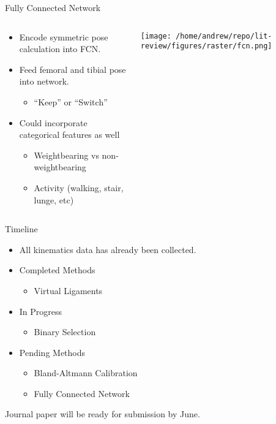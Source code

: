\documentclass[presentation, aspectratio=1610]{beamer}
\begin{document}
\begin{frame}[label={sec:org2197c22}]{Fully Connected Network}
\begin{columns}
\begin{column}{0.5\columnwidth}
\begin{itemize}
\item Encode symmetric pose calculation into FCN.
\item Feed femoral and tibial \alert{\alert{pose}} into network.
\begin{itemize}
\item ``Keep'' or ``Switch''
\end{itemize}
\item Could incorporate categorical features as well
\begin{itemize}
\item Weightbearing vs non-weightbearing
\item Activity (walking, stair, lunge, etc)
\end{itemize}
\end{itemize}
\end{column}

\begin{column}{0.6\columnwidth}
\begin{center}
\texttt{[image: /home/andrew/repo/lit-review/figures/raster/fcn.png]}
\end{center}
\end{column}
\end{columns}
\end{frame}

\begin{frame}[label={sec:org68f2390}]{Timeline}
\begin{itemize}
\item All kinematics data has already been collected.
\item Completed Methods
\begin{itemize}
\item Virtual Ligaments
\end{itemize}
\item In Progress
\begin{itemize}
\item Binary Selection
\end{itemize}
\item Pending Methods
\begin{itemize}
\item Bland-Altmann Calibration
\item Fully Connected Network
\end{itemize}
\end{itemize}

Journal paper will be ready for submission by June.
\end{frame}
\end{document}
